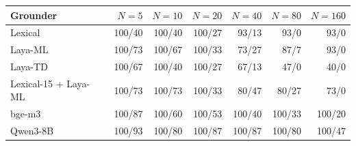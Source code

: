 \begin{tabular}{lrrrrrr}
\toprule
Grounder & $N{=}5$ & $N{=}10$ & $N{=}20$ & $N{=}40$ & $N{=}80$ & $N{=}160$ \\
\midrule
Lexical & 100/40 & 100/40 & 100/27 & 93/13 & 93/0 & 93/0 \\
Laya-ML & 100/73 & 100/67 & 100/33 & 73/27 & 87/7 & 93/0 \\
Laya-TD & 100/67 & 100/40 & 100/27 & 67/13 & 47/0 & 40/0 \\
Lexical-15 + Laya-ML & 100/73 & 100/73 & 100/33 & 80/47 & 80/27 & 73/0 \\
bge-m3 & 100/87 & 100/60 & 100/53 & 100/40 & 100/33 & 100/20 \\
Qwen3-8B & 100/93 & 100/80 & 100/87 & 100/87 & 100/80 & 100/47 \\
\bottomrule
\end{tabular}

